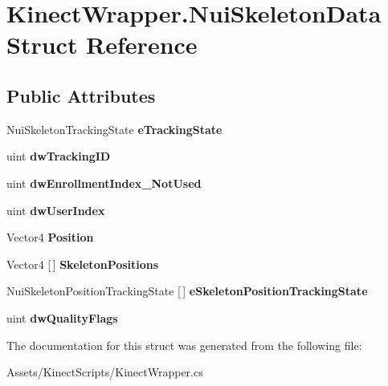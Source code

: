 \hypertarget{struct_kinect_wrapper_1_1_nui_skeleton_data}{}\section{Kinect\+Wrapper.\+Nui\+Skeleton\+Data Struct Reference}
\label{struct_kinect_wrapper_1_1_nui_skeleton_data}
\subsection*{Public Attributes}
\begin{DoxyCompactItemize}
\item 
\mbox{\label{struct_kinect_wrapper_1_1_nui_skeleton_data_a7614d2a370539c90ecb50c90fa6a23af}} 
Nui\+Skeleton\+Tracking\+State {\bfseries e\+Tracking\+State}
\item 
\mbox{\label{struct_kinect_wrapper_1_1_nui_skeleton_data_a5d26d520d15dd02387ae88005582ddb4}} 
uint {\bfseries dw\+Tracking\+ID}
\item 
\mbox{\label{struct_kinect_wrapper_1_1_nui_skeleton_data_af7a43abd31650ea9ab62cf3dc42cb5f7}} 
uint {\bfseries dw\+Enrollment\+Index\+\_\+\+Not\+Used}
\item 
\mbox{\label{struct_kinect_wrapper_1_1_nui_skeleton_data_aa364897b7124bac16ac908be1f7d1d02}} 
uint {\bfseries dw\+User\+Index}
\item 
\mbox{\label{struct_kinect_wrapper_1_1_nui_skeleton_data_a04ade70ce81c5c2f6bb2b9e9b4594e81}} 
Vector4 {\bfseries Position}
\item 
\mbox{\label{struct_kinect_wrapper_1_1_nui_skeleton_data_a022c731ef5e8d0df3673a137f4d9be4a}} 
Vector4 \mbox{[}$\,$\mbox{]} {\bfseries Skeleton\+Positions}
\item 
\mbox{\label{struct_kinect_wrapper_1_1_nui_skeleton_data_a9a7d78f99876e8973dd6ac8e0ea99817}} 
Nui\+Skeleton\+Position\+Tracking\+State \mbox{[}$\,$\mbox{]} {\bfseries e\+Skeleton\+Position\+Tracking\+State}
\item 
\mbox{\label{struct_kinect_wrapper_1_1_nui_skeleton_data_a1b89a36bfe4139ff50ac3a1e26351098}} 
uint {\bfseries dw\+Quality\+Flags}
\end{DoxyCompactItemize}


The documentation for this struct was generated from the following file\+:\begin{DoxyCompactItemize}
\item 
Assets/\+Kinect\+Scripts/Kinect\+Wrapper.\+cs\end{DoxyCompactItemize}
